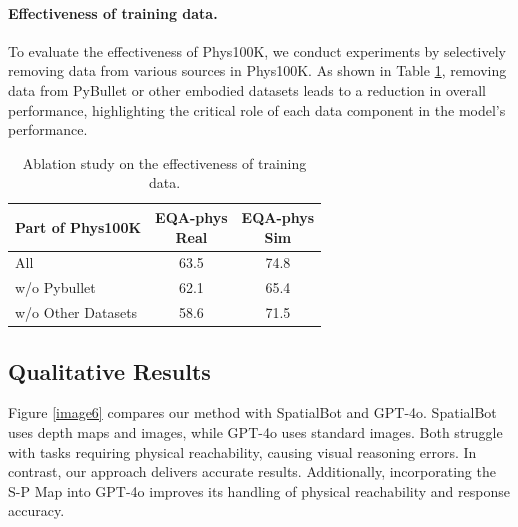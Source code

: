 \documentclass[10pt,twocolumn,letterpaper]{article}
\begin{document}
\paragraph{Effectiveness of training data.}

To evaluate the effectiveness of Phys100K, we conduct experiments by selectively removing data from various sources in Phys100K. As shown in Table \ref{table7}, removing data from PyBullet or other embodied datasets leads to a reduction in overall performance, highlighting the critical role of each data component in the model's performance.

\begin{table}[ht]
\caption{Ablation study on the effectiveness of training data.}
\label{table7}

\begin{center}
\begin{small}
\begin{sc}
\begin{tabular}{lcc}
\toprule
Part of Phys100K & \makecell[l]{EQA-phys\\Real} & \makecell[l]{EQA-phys\\Sim} \\
\midrule
All & 63.5 & 74.8  \\
w/o Pybullet & 62.1 & 65.4  \\
w/o Other Datasets & 58.6 & 71.5  \\
\bottomrule
\end{tabular}
\end{sc}
\end{small}
\end{center}
\vskip -0.1in
\end{table}

\subsection{Qualitative Results}
Figure \ref{image6} compares our method with SpatialBot and GPT-4o. SpatialBot uses depth maps and images, while GPT-4o uses standard images. Both struggle with tasks requiring physical reachability, causing visual reasoning errors. In contrast, our approach delivers accurate results. Additionally, incorporating the S-P Map into GPT-4o improves its handling of physical reachability and response accuracy.
\end{document}
